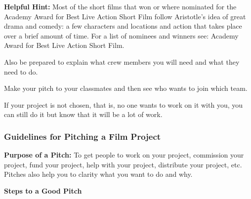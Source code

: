 \documentclass[
]{book}
\begin{document}
\begin{caution}
\textbf{Helpful Hint:} Most of the short films that won or where nominated for the Academy Award for Best Live Action Short Film follow Aristotle's idea of great drama and comedy: a few characters and locations and action that takes place over a brief amount of time. For a list of nominees and winners see: Academy Award for Best Live Action Short Film.
\end{caution}

\begin{reflect}
Also be prepared to explain what crew members you will need and what they need to do.

Make your pitch to your classmates and then see who wants to join which team.

If your project is not chosen, that is, no one wants to work on it with you, you can still do it but know that it will be a lot of work.

\hypertarget{guidelines-for-pitching-a-film-project}{%
\subsubsection*{Guidelines for Pitching a Film Project}\label{guidelines-for-pitching-a-film-project}}

\textbf{Purpose of a Pitch:} To get people to work on your project, commission your
project, fund your project, help with your project, distribute your project,
etc. Pitches also help you to clarity what you want to do and why.

\textbf{Steps to a Good Pitch}


\end{reflect}
\end{document}
